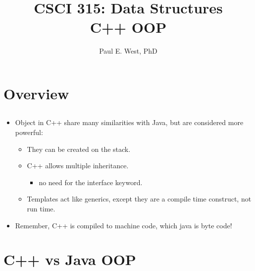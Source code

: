 \documentclass{beamer}
\title{CSCI 315: Data Structures \\ C++ OOP}
\author{Paul E. West, PhD}
\institute{
  Department of Computer Science\\
  Charleston Southern University
}
\begin{document}
\begin{frame}
  \titlepage
\end{frame}

\section{Overview}
\subsection{}

\begin{frame}{}
\begin{itemize}
\item Object in C++ share many similarities with Java, but are considered more powerful:
\begin{itemize}
\item They can be created on the stack.
\item C++ allows multiple inheritance.
\begin{itemize}
\item no need for the interface keyword.
\end{itemize}
\item Templates act like generics, except they are a compile time construct, not run time.
\end{itemize}
\item Remember, C++ is compiled to machine code, which java is byte code!
\end{itemize}
\end{frame}

\section{C++ vs Java OOP}
\subsection{}
\end{document}
